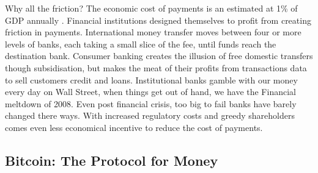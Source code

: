 \documentclass[12pt]{article} %
\begin{document}

Why all the friction? The economic cost of payments is an estimated at 1\% of GDP annually \cite{kaarmann2013cost}. Financial institutions designed themselves to profit from creating friction in payments. International money transfer moves between four or more levels of banks, each taking a small slice of the fee, until funds reach the destination bank. Consumer banking creates the illusion of free domestic transfers though subsidisation, but makes the meat of their profits from transactions data to sell customers credit and loans. Institutional banks gamble with our money every day on Wall Street, when things get out of hand, we have the Financial meltdown of 2008. Even post financial crisis, too big to fail banks have barely changed there ways. With increased regulatory costs and greedy shareholders comes even less economical incentive to reduce the cost of payments.

\subsection{Bitcoin: The Protocol for Money}
\end{document}
